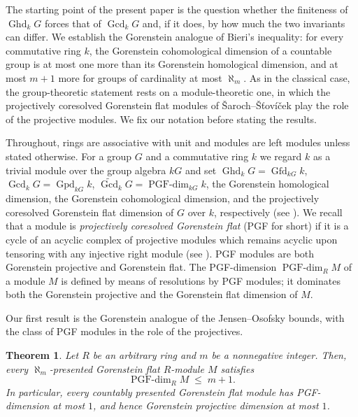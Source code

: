 \documentclass[12pt]{amsart}
\theoremstyle{remark}
\theoremstyle{definition}
\theoremstyle{plain}
\newtheorem{introtheorem}{Theorem}
\DeclareMathOperator{\Ghd}{Ghd}
\DeclareMathOperator{\Gcd}{Gcd}
\DeclareMathOperator{\Gfd}{Gfd}
\DeclareMathOperator{\Gpd}{Gpd}
\newcommand{\PGFdim}{\operatorname{PGF\text{-}dim}}
\newcommand{\PGFcd}{\widetilde{\Gcd}}
\newcommand{\alephm}{\aleph_m}
\begin{document}
 The starting point of the present paper is the question whether the finiteness of $\Ghd_kG$ forces that of $\Gcd_kG$ and, if it does, by how much the two invariants can differ. We establish the Gorenstein analogue of Bieri's inequality: for every commutative ring $k$, the Gorenstein cohomological dimension of a countable group is at most one more than its Gorenstein homological dimension, and at most $m+1$ more for groups of cardinality at most $\alephm$. As in the classical case, the group-theoretic statement rests on a module-theoretic one, in which the projectively coresolved Gorenstein flat modules of \v{S}aroch--\v{S}\v{t}ov\'i\v{c}ek \cite{SS} play the role of the projective modules. We fix our notation before stating the results.

Throughout, rings are associative with unit and modules are left modules unless stated otherwise. For a group $G$ and a commutative ring $k$ we regard $k$ as a trivial module over the group algebra $kG$ and set $\Ghd_kG=\Gfd_{kG}k$,
$\Gcd_kG=\Gpd_{kG}k$, $\PGFcd_kG=\PGFdim_{kG}k$,
the Gorenstein homological dimension, the Gorenstein cohomological dimension, and the projectively coresolved Gorenstein flat dimension of $G$ over $k$, respectively (see \cite{St,KS}). We recall that a module is \emph{projectively coresolved Gorenstein flat} (PGF for short) if it is a cycle of an acyclic complex of projective modules which remains acyclic upon tensoring with any injective right module (see \cite{SS}). PGF modules are both Gorenstein projective and Gorenstein flat. The PGF-dimension $\PGFdim_RM$ of a module $M$ is defined by means of resolutions by PGF modules; it dominates both the Gorenstein projective and the Gorenstein flat dimension of $M$.

   Our first result is the Gorenstein analogue of the Jensen--Osofsky bounds, with the class of PGF modules in the role of the projectives.

\begin{introtheorem}\label{theoA}
Let $R$ be an arbitrary ring and $m$ be a nonnegative integer. Then, every $\alephm$-presented Gorenstein flat $R$-module $M$ satisfies
\[
\PGFdim_RM\;\le\;m+1 .
\]
In particular, every countably presented Gorenstein flat module has PGF-dimension at most $1$, and hence Gorenstein projective dimension at most $1$.
\end{introtheorem}
\end{document}
